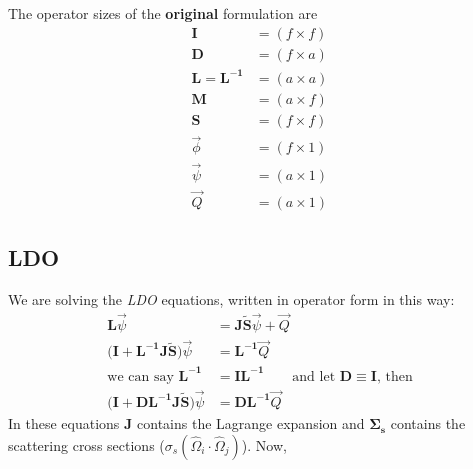 \documentclass[12pt,twoside]{article}
\newcommand{\ve}[1]{\ensuremath{\mathbf{#1}}}
\begin{document}
\vspace*{1 em}
The operator sizes of the \textbf{original} formulation are
\begin{align*}
\ve{I} &= (f \times f) \\
\ve{D} &= (f \times a) \\
\ve{L} = \ve{L^{-1}} &= (a \times a) \\
\ve{M} &= (a \times f) \\
\ve{S} &= (f \times f) \\
\vec{\phi} &= (f \times 1) \\
\vec{\psi} &= (a \times 1) \\
\vec{Q} &= (a \times 1)
\end{align*}


\subsection*{LDO}
We are solving the \textit{LDO} equations, written in operator form in this way:
%
\begin{align}
\ve{L}\vec{\psi} &= \ve{J \tilde{S}}\vec{\psi} + \vec{Q}\\
\bigl(\ve{I} + \ve{L^{-1} J \tilde{S}}\bigr)\vec{\psi} &= \ve{L^{-1}}\vec{Q} \nonumber \\ 
\text{we can say }\ve{L^{-1}} &= \ve{I}\ve{L^{-1}} \qquad \text{and let } \ve{D} \equiv \ve{I} \text{, then} \nonumber\\
\bigl(\ve{I} + \ve{D L^{-1} J \tilde{S}}\bigr)\vec{\psi} &= \ve{D L^{-1}}\vec{Q}
\end{align}
% 
In these equations $\ve{J}$ contains the Lagrange expansion and $\ve{\Sigma_s}$ contains the scattering cross sections ($\sigma_s(\hat{\Omega}_i \cdot \hat{\Omega}_j)$).
%
Now, 
\end{document}
